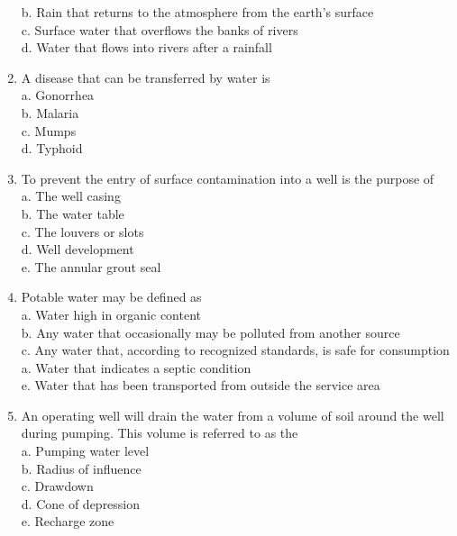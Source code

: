 \begin{enumerate}
b. Rain that returns to the atmosphere from the earth's surface\\

c. Surface water that overflows the banks of rivers\\

d. Water that flows into rivers after a rainfall\\

  \item A disease that can be transferred by water is\\
a. Gonorrhea\\
b. Malaria\\
c. Mumps\\
d. Typhoid\\



  \item To prevent the entry of surface contamination into a well is the purpose of\\

a. The well casing\\

b. The water table\\

c. The louvers or slots\\

d. Well development\\

e. The annular grout seal\\

\item Potable water may be defined as\\

a. Water high in organic content\\

b. Any water that occasionally may be polluted from another source\\

c. Any water that, according to recognized standards, is safe for consumption\\

a. Water that indicates a septic condition\\

e. Water that has been transported from outside the service area\\

\item An operating well will drain the water from a volume of soil around the well during pumping. This volume is referred to as the\\
a.	Pumping water level\\
b.	Radius of influence\\
c.	Drawdown\\
d. Cone of depression\\
e.	Recharge zone\\


\end{enumerate}
